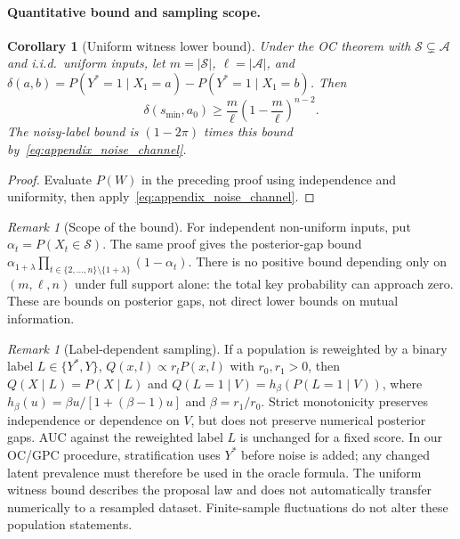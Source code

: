 \documentclass{article} %
\theoremstyle{plain}
\newtheorem{corollary}[theorem]{Corollary}
\theoremstyle{definition}
\theoremstyle{remark}
\newtheorem{remark}[theorem]{Remark}
\begin{document}
\paragraph{Quantitative bound and sampling scope.}
\label{sec:uniform_witness_bound}
\label{appendix:proof_uniform_witness_bound}

\begin{corollary}[Uniform witness lower bound]
\label{cor:uniform_witness_bound}
Under the OC theorem with $\mathcal S\subsetneq\mathcal A$ and i.i.d.\
uniform inputs, let $m=|\mathcal S|$, $\ell=|\mathcal A|$, and
$\delta(a,b)=P(Y^*=1\mid X_1=a)-P(Y^*=1\mid X_1=b)$. Then
\begin{equation}
\label{eq:witness_clean}
\delta(s_{\min},a_0)\geq\frac m\ell
\left(1-\frac m\ell\right)^{n-2}.
\end{equation}
The noisy-label bound is $(1-2\pi)$ times this bound by~\eqref{eq:appendix_noise_channel}.

\end{corollary}
\begin{proof}
Evaluate $P(W)$ in the preceding proof using independence and uniformity,
then apply~\eqref{eq:appendix_noise_channel}.
\end{proof}

\begin{remark}[Scope of the bound]
\label{rem:scope_uniform_bound}
For independent non-uniform inputs, put $\alpha_t=P(X_t\in\mathcal S)$.
The same proof gives the posterior-gap bound
$\alpha_{1+\lambda}\prod_{t\in\{2,\ldots,n\}\setminus\{1+\lambda\}}
(1-\alpha_t)$.
There is no positive bound depending only on $(m,\ell,n)$ under full
support alone: the total key probability can approach zero. These are
bounds on posterior gaps, not direct lower bounds on mutual information.
\end{remark}

\begin{remark}[Label-dependent sampling]
\label{rem:label_balancing}
If a population is reweighted by a binary label $L\in\{Y^*,Y\}$,
$Q(x,l)\propto r_lP(x,l)$ with $r_0,r_1>0$, then
$Q(X\mid L)=P(X\mid L)$ and
$Q(L=1\mid V)=h_\beta(P(L=1\mid V))$, where
$h_\beta(u)=\beta u/[1+(\beta-1)u]$ and $\beta=r_1/r_0$.
Strict monotonicity preserves independence or dependence on $V$, but does
not preserve numerical posterior gaps. AUC against the reweighted label
$L$ is unchanged for a fixed score. In our OC/GPC procedure, stratification
uses $Y^*$ before noise is added; any changed latent prevalence must therefore
be used in the oracle formula. The uniform witness bound describes the
proposal law and does not automatically transfer numerically to a resampled
dataset. Finite-sample fluctuations do not alter these population statements.
\end{remark}
\end{document}
